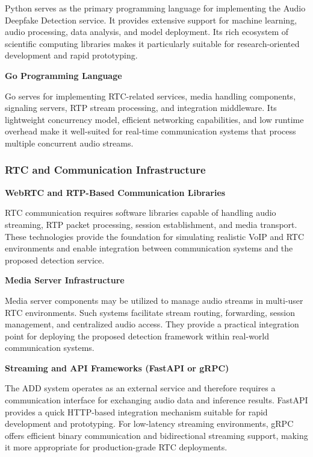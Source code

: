 Python serves as the primary programming language for implementing the Audio Deepfake Detection service. It provides extensive support for machine learning, audio processing, data analysis, and model deployment. Its rich ecosystem of scientific computing libraries makes it particularly suitable for research-oriented development and rapid prototyping.

\textbf{Go Programming Language}

Go serves for implementing RTC-related services, media handling components, signaling servers, RTP stream processing, and integration middleware. Its lightweight concurrency model, efficient networking capabilities, and low runtime overhead make it well-suited for real-time communication systems that process multiple concurrent audio streams.


\subsubsection{RTC and Communication Infrastructure}
\vspace{0.5cm}
\textbf{WebRTC and RTP-Based Communication Libraries}

RTC communication requires software libraries capable of handling audio streaming, RTP packet processing, session establishment, and media transport. These technologies provide the foundation for simulating realistic VoIP and RTC environments and enable integration between communication systems and the proposed detection service.

\textbf{Media Server Infrastructure}

Media server components may be utilized to manage audio streams in multi-user RTC environments. Such systems facilitate stream routing, forwarding, session management, and centralized audio access. They provide a practical integration point for deploying the proposed detection framework within real-world communication systems.

\textbf{Streaming and API Frameworks (FastAPI or gRPC)}

The ADD system operates as an external service and therefore requires a communication interface for exchanging audio data and inference results. FastAPI provides a quick HTTP-based integration mechanism suitable for rapid development and prototyping. For low-latency streaming environments, gRPC offers efficient binary communication and bidirectional streaming support, making it more appropriate for production-grade RTC deployments.


